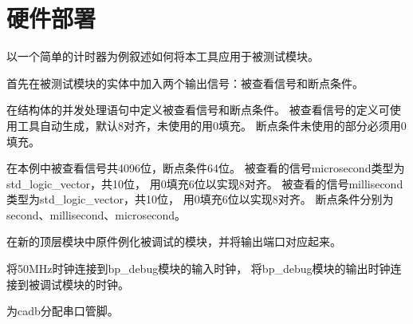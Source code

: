 \section{硬件部署}
    以一个简单的计时器为例叙述如何将本工具应用于被测试模块。

    首先在被测试模块的实体中加入两个输出信号：被查看信号和断点条件。

    在结构体的并发处理语句中定义被查看信号和断点条件。%
    被查看信号的定义可使用工具自动生成，默认8对齐，未使用的用0填充。%
    断点条件未使用的部分必须用0填充。

    在本例中被查看信号共4096位，断点条件64位。%
    被查看的信号microsecond类型为std\_logic\_vector，共10位，%
    用0填充6位以实现8对齐。%
    被查看的信号millisecond类型为std\_logic\_vector，共10位，%
    用0填充6位以实现8对齐。%
    断点条件分别为second、millisecond、microsecond。

    
    
    在新的顶层模块中原件例化被调试的模块，并将输出端口对应起来。

    

    将50MHz时钟连接到bp\_debug模块的输入时钟，%
    将bp\_debug模块的输出时钟连接到被调试模块的时钟。

    为cadb分配串口管脚。
